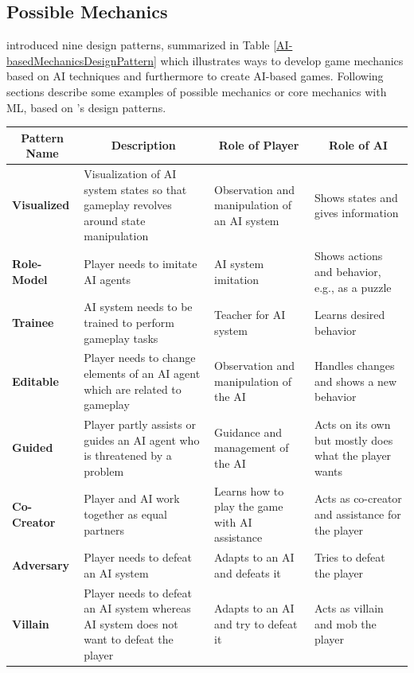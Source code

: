 \documentclass[MGS,Master,english]{twbook}%
\begin{document}
\subsection{Possible Mechanics}
\citep{ai::aiBasedGameDesignPattern} introduced nine design patterns, summarized in Table \ref{AI-basedMechanicsDesignPattern} which illustrates ways to develop game mechanics based on \ac{AI} techniques and furthermore to create \ac{AI}-based games. Following sections describe some examples of possible mechanics or core mechanics with \ac{ML}, based on 's design patterns.
\begin{table}[!ht]
	\centering
	\resizebox{\textwidth}{!}
	{%
		\begin{tabular}{|p{2.1cm}||p{8cm}|p{4cm}|p{4cm}|}
			\hline
			\multicolumn{1}{|c||}{\textbf{Pattern Name}} & \multicolumn{1}{c|}{\textbf{Description}} & \multicolumn{1}{c|}{\textbf{Role of Player}} & \multicolumn{1}{c|}{\textbf{Role of \ac{AI}}} \\ \hline\hline
			\textbf{Visualized} & Visualization of \ac{AI} system states so that gameplay revolves around state manipulation & Observation and manipulation of an \ac{AI} system & Shows states and gives information \\ \hline
			\textbf{Role-Model} & Player needs to imitate \ac{AI} agents & \ac{AI} system imitation & Shows actions and behavior, e.g., as a puzzle \\ \hline
			\textbf{Trainee} & \ac{AI} system needs to be trained to perform gameplay tasks & Teacher for \ac{AI} system & Learns desired behavior \\ \hline
			\textbf{Editable} & Player needs to change elements of an \ac{AI} agent which are related to gameplay & Observation and manipulation of the \ac{AI} & Handles changes and shows a new behavior \\ \hline
			\textbf{Guided} & Player partly assists or guides an \ac{AI} agent who is threatened  by a problem & Guidance and management of the \ac{AI} & Acts on its own but mostly does what the player wants \\ \hline
			\textbf{Co-Creator} & Player and \ac{AI} work together as equal partners & Learns how to play the game with \ac{AI} assistance & Acts as co-creator and assistance for the player \\ \hline
			\textbf{Adversary} & Player needs to defeat an \ac{AI} system & Adapts to an \ac{AI} and defeats it & Tries to defeat the player \\ \hline
			\textbf{Villain} & Player needs to defeat an \ac{AI} system whereas \ac{AI} system does not want to defeat the player & Adapts to an \ac{AI} and try to defeat it & Acts as villain and mob the player \\ \hline

\end{tabular}}
\end{table}
\end{document}

